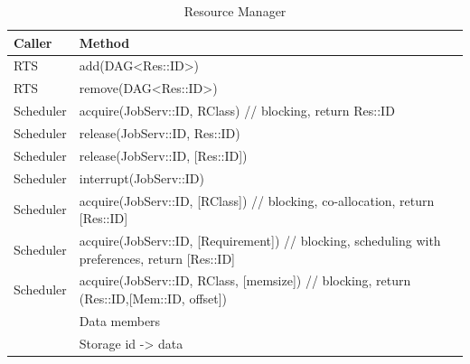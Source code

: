 \documentclass[10pt]{article}
\newcommand{\rts}{RTS\xspace}
\newcommand{\sched}{Scheduler\xspace}
\newcommand{\rdag}{DAG\xspace}
\newcommand{\js}{JobServ\xspace}
\newcommand{\res}{Res\xspace}
\newcommand{\rc}{RClass\xspace}
\newcommand{\req}{Requirement\xspace}
\newcommand{\id}{::ID\xspace}
\begin{document}
%
\begin{table}[ht]
    \centering
    \caption{Resource Manager}
    \label{tab:rm}
    \bgroup
    \setlength{\tabcolsep}{2em}
    \begin{tabular}{ll}
        \toprule
        Caller & Method \\
        \midrule
        \rts & add(\rdag<\res\id>) \\
        \rts & remove(\rdag<\res\id>) \\
        \sched & acquire(\js\id, \rc) // blocking, return \res\id  \\
        \sched & release(\js\id, \res\id) \\ 
        \sched & release(\js\id, [\res\id]) \\
        \sched & interrupt(\js\id) \\
        \midrule
        \sched & acquire(\js\id, [\rc]) // blocking, co-allocation, 
        return [\res\id]  \\
        \sched & acquire(\js\id, [\req]) // blocking, 
        scheduling with preferences, return [\res\id]  \\
        \sched & acquire(\js\id, \rc, [memsize]) // blocking, 
        return (\res\id,[Mem\id, offset])  \\
        \midrule
        & Data members \\
        \midrule
        & Storage id -> data \\
        \bottomrule
    \end{tabular}
    \egroup
\end{table}
%
\end{document}
